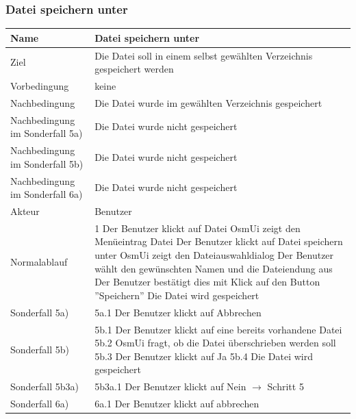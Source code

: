 \documentclass[a4paper,12pt]{scrartcl}
\begin{document}
\subsubsection{Datei speichern unter}
\begin{center}
\begin{tabular}{|p{5cm}|p{10cm}|}
\hline Name & \textbf{Datei speichern unter} \\ 
\hline Ziel & Die Datei soll in einem selbst gewählten Verzeichnis gespeichert werden \\ 
\hline Vorbedingung & keine \\ 
\hline Nachbedingung & Die Datei wurde im gewählten Verzeichnis gespeichert\\ 
\hline Nachbedingung im Sonderfall 5a)& Die Datei wurde nicht gespeichert\\ 
\hline Nachbedingung im Sonderfall 5b)& Die Datei wurde nicht gespeichert\\
\hline Nachbedingung im Sonderfall 6a)& Die Datei wurde nicht gespeichert\\ 
\hline Akteur & Benutzer \\ 
\hline Normalablauf & 1 Der Benutzer klickt auf Datei
\newline 2 OsmUi zeigt den Menüeintrag Datei
\newline 3 Der Benutzer klickt auf Datei speichern unter
\newline 4 OsmUi zeigt den Dateiauswahldialog
\newline 5 Der Benutzer wählt den gewünschten Namen und die Dateiendung aus
\newline 6 Der Benutzer bestätigt dies mit Klick auf den Button ''Speichern'' 
\newline 7 Die Datei wird gespeichert\\
\hline Sonderfall 5a) & 5a.1 Der Benutzer klickt auf Abbrechen\\
\hline Sonderfall 5b) & 5b.1 Der Benutzer klickt auf eine bereits vorhandene Datei
\newline 5b.2 OsmUi fragt, ob die Datei überschrieben werden soll
\newline 5b.3 Der Benutzer klickt auf Ja
\newline 5b.4 Die Datei wird gespeichert\\
\hline Sonderfall 5b3a) & 5b3a.1 Der Benutzer klickt auf Nein
\newline $ \rightarrow$ Schritt 5\\
\hline Sonderfall 6a) & 6a.1 Der Benutzer klickt auf abbrechen\\
\hline 
\end{tabular}
\end{center}
\end{document}
